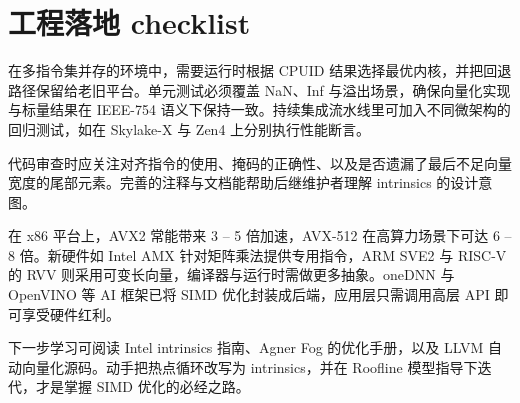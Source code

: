 \chapter{工程落地 checklist}
在多指令集并存的环境中，需要运行时根据 CPUID 结果选择最优内核，并把回退路径保留给老旧平台。单元测试必须覆盖 NaN、Inf 与溢出场景，确保向量化实现与标量结果在 IEEE-754 语义下保持一致。持续集成流水线里可加入不同微架构的回归测试，如在 Skylake-X 与 Zen4 上分别执行性能断言。\par
代码审查时应关注对齐指令的使用、掩码的正确性、以及是否遗漏了最后不足向量宽度的尾部元素。完善的注释与文档能帮助后继维护者理解 intrinsics 的设计意图。\par
在 x86 平台上，AVX2 常能带来 3 – 5 倍加速，AVX-512 在高算力场景下可达 6 – 8 倍。新硬件如 Intel AMX 针对矩阵乘法提供专用指令，ARM SVE2 与 RISC-V 的 RVV 则采用可变长向量，编译器与运行时需做更多抽象。oneDNN 与 OpenVINO 等 AI 框架已将 SIMD 优化封装成后端，应用层只需调用高层 API 即可享受硬件红利。\par
下一步学习可阅读 Intel intrinsics 指南、Agner Fog 的优化手册，以及 LLVM 自动向量化源码。动手把热点循环改写为 intrinsics，并在 Roofline 模型指导下迭代，才是掌握 SIMD 优化的必经之路。\par
